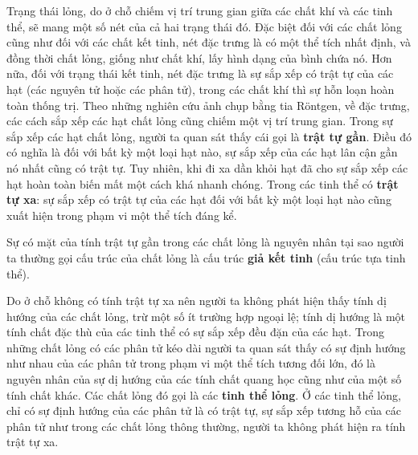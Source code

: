 Trạng thái lỏng, do ở chỗ chiếm vị trí trung gian giữa các chất khí và các tinh thể, sẽ mang một số nét của cả hai trạng thái đó. Đặc biệt đối với các chất lỏng cũng như đối với các chất kết tinh, nét đặc trưng là có một thể tích nhất định, và đồng thời chất lỏng, giống như chất khí, lấy hình dạng của bình chứa nó. Hơn nữa, đối với trạng thái kết tinh, nét đặc trưng là sự sắp xếp có trật tự của các hạt (các nguyên tử hoặc các phân tử), trong các chất khí thì sự hỗn loạn hoàn toàn thống trị. Theo những nghiên cứu ảnh chụp bằng tia Röntgen, về đặc trưng, các cách sắp xếp các hạt chất lỏng cũng chiếm một vị trí trung gian. Trong sự sắp xếp các hạt chất lỏng, người ta quan sát thấy cái gọi là \textbf{trật tự gần}. Điều đó có nghĩa là đối với bất kỳ một loại hạt nào, sự sắp xếp của các hạt lân cận gần nó nhất cũng có trật tự. Tuy nhiên, khi đi xa dần khỏi hạt đã cho sự sắp xếp các hạt hoàn toàn biến mất một cách khá nhanh chóng. Trong các tinh thể có \textbf{trật tự xa}: sự sắp xếp có trật tự của các hạt đối với bất kỳ một loại hạt nào cũng xuất hiện trong phạm vi một thể tích đáng kể.


Sự có mặt của tính trật tự gần trong các chất lỏng là nguyên nhân tại sao người ta thường gọi cấu trúc của chất lỏng là cấu trúc \textbf{giả kết tinh} (cấu trúc tựa tinh thể).


Do ở chỗ không có tính trật tự xa nên người ta không phát hiện thấy tính dị hướng của các chất lỏng, trừ một số ít trường hợp ngoại lệ; tính dị hướng là một tính chất đặc thù của các tinh thể có sự sắp xếp đều đặn của các hạt. Trong những chất lỏng có các phân tử kéo dài người ta quan sát thấy có sự định hướng như nhau của các phân tử trong phạm vi một thể tích tương đối lớn, đó là nguyên nhân của sự dị hướng của các tính chất quang học cũng như của một số tính chất khác. Các chất lỏng đó gọi là các \textbf{tinh thể lỏng}. Ở các tinh thể lỏng, chỉ có sự định hướng của các phân tử là có trật tự, sự sắp xếp tương hỗ của các phân tử như trong các chất lỏng thông thường, người ta không phát hiện ra tính trật tự xa.


